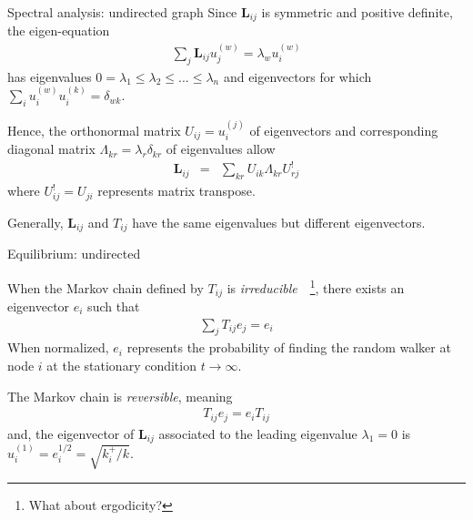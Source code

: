 \documentclass{beamer}
\begin{document}
\begin{frame}{Spectral analysis: undirected graph}
Since $\mathbf{L}_{ij}$ is symmetric and positive definite,
the eigen-equation
\begin{eqnarray}
\sum_j
\mathbf{L}_{ij}
u_j^{(w)}
=
\lambda_w
u_i^{(w)}
\end{eqnarray}
has eigenvalues
$0=\lambda_1\leq \lambda_2 \leq ... \leq \lambda_n$ and eigenvectors for which $\sum_i u_i^{(w)} u_i^{(k)}=\delta_{wk}$.

\vspace{.25cm}

Hence, the orthonormal matrix $U_{ij}=u_i^{(j)}$ of eigenvectors and corresponding diagonal matrix $\Lambda_{kr}=\lambda_r \delta_{kr}$ of eigenvalues allow
\begin{eqnarray}
\mathbf{L}_{ij}
&=&
\sum_{kr}
U_{ik}
\Lambda_{kr}
U^!_{rj}
\end{eqnarray}
where $U^!_{ij}=U_{ji}$ represents matrix transpose.

\vspace{0.25cm}

Generally, $\mathbf{L}_{ij}$ and $T_{ij}$ have the same eigenvalues but different eigenvectors.

\end{frame}


\begin{frame}{Equilibrium: undirected}

When the Markov chain defined by $T_{ij}$ is {\em irreducible}~\cite{yanhua2010random}~\footnote{What about ergodicity?}, there exists an eigenvector $e_i$ such that
\begin{eqnarray}
\sum_j T_{ij} e_j = e_i
\end{eqnarray}
When normalized, $e_i$ represents the probability of finding the random walker at node $i$ at the stationary condition $t\to \infty$.

\vspace{0.25cm}

The Markov chain is {\em reversible}, meaning
\begin{eqnarray}
\label{Xeq7}
T_{ij} e_j
=
e_i T_{ij} 
\end{eqnarray}
and, the eigenvector of $\mathbf{L}_{ij}$ associated to the leading eigenvalue $\lambda_1=0$ is
$u^{(1)}_i = e_i^{1/2} = \sqrt{k^+_i/k}$.

\end{frame}
\end{document}
